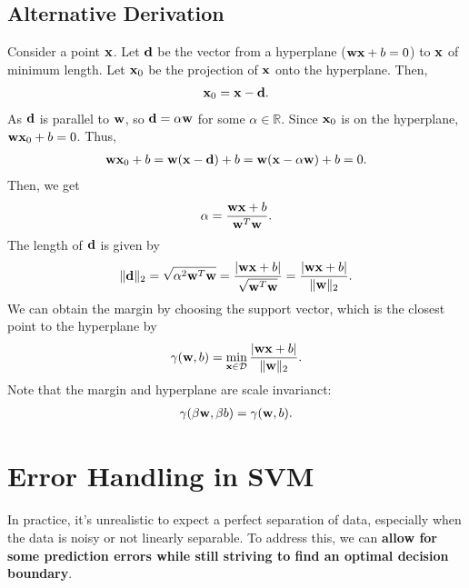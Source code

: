 \subsection{Alternative Derivation}
Consider a point ${\mathbf{x}}$. Let ${\mathbf{d}}$ be the vector from a hyperplane (\ie ${\mathbf{w}}{\mathbf{x}}+b=0$) to ${\mathbf{x}}$ of minimum length. Let ${\mathbf{x}}_0$ be the projection of ${\mathbf{x}}$ onto the hyperplane. Then, 
\begin{align*}
	{\mathbf{x}}_0 = {\mathbf{x}} - {\mathbf{d}}.
\end{align*}
As ${\mathbf{d}}$ is parallel to ${\mathbf{w}}$, so ${\mathbf{d}} = \alpha {\mathbf{w}}$ for some $\alpha\in \mathbb{R}$. Since ${\mathbf{x}}_0$ is on the hyperplane, ${\mathbf{w}}{\mathbf{x}}_0 + b = 0$. Thus, 
\begin{align*}
	{\mathbf{w}}{\mathbf{x}}_0 + b = {\mathbf{w}}({\mathbf{x}}-{\mathbf{d}}) + b = {\mathbf{w}}({\mathbf{x}}-\alpha{\mathbf{w}}) + b = 0.
\end{align*}
Then, we get
\begin{align*}
	\alpha = \frac{{\mathbf{w}}{\mathbf{x}}+b}{{\mathbf{w}}^T{\mathbf{w}}}.
\end{align*}
The length of ${\mathbf{d}}$ is given by  
\begin{align*}
	\|{\mathbf{d}}\|_2 = \sqrt{\alpha^2{\mathbf{w}}^T{\mathbf{w}}} = \frac{|{\mathbf{w}}{\mathbf{x}}+b|}{\sqrt{{\mathbf{w}}^T{\mathbf{w}}}} = \frac{|{\mathbf{w}}{\mathbf{x}}+b|}{\|{\mathbf{w}}\|_2}.
\end{align*}
We can obtain the margin by choosing the support vector, which is the closest point to the hyperplane by
\begin{align*}
	\gamma({\mathbf{w}}, b) = \min_{{\mathbf{x}}\in \mathcal{D}}\frac{|{\mathbf{w}}{\mathbf{x}}+b|}{\|{\mathbf{w}}\|_2}.
\end{align*}
Note that the margin and hyperplane are scale invarianct:
\begin{align*}
	\gamma(\beta{\mathbf{w}}, \beta b) = \gamma({\mathbf{w}}, b).
\end{align*}


\section{Error Handling in SVM}
In practice, it's unrealistic to expect a perfect separation of data, especially when the data is noisy or not linearly separable. To address this, we can \textbf{allow for some prediction errors while still striving to find an optimal decision boundary}.

